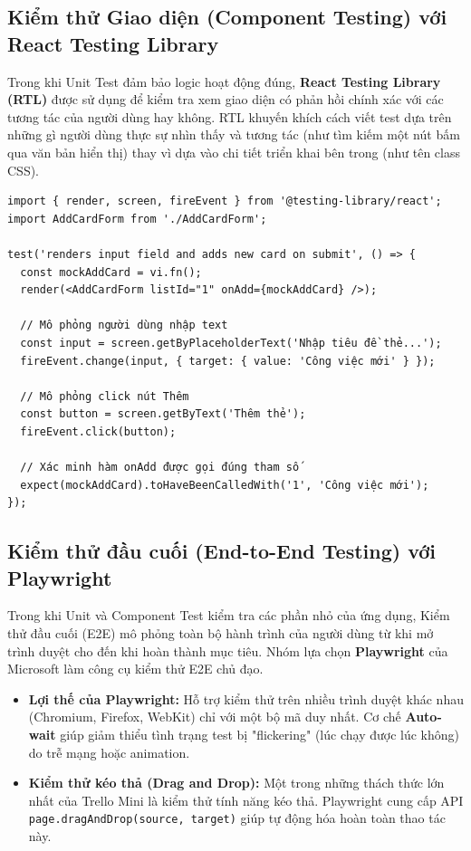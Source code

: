 \subsection{Kiểm thử Giao diện (Component Testing) với React Testing Library}
Trong khi Unit Test đảm bảo logic hoạt động đúng, \textbf{React Testing Library (RTL)} được sử dụng để kiểm tra xem giao diện có phản hồi chính xác với các tương tác của người dùng hay không. RTL khuyến khích cách viết test dựa trên những gì người dùng thực sự nhìn thấy và tương tác (như tìm kiếm một nút bấm qua văn bản hiển thị) thay vì dựa vào chi tiết triển khai bên trong (như tên class CSS).

\begin{Verbatim}
import { render, screen, fireEvent } from '@testing-library/react';
import AddCardForm from './AddCardForm';

test('renders input field and adds new card on submit', () => {
  const mockAddCard = vi.fn();
  render(<AddCardForm listId="1" onAdd={mockAddCard} />);

  // Mô phỏng người dùng nhập text
  const input = screen.getByPlaceholderText('Nhập tiêu đề thẻ...');
  fireEvent.change(input, { target: { value: 'Công việc mới' } });

  // Mô phỏng click nút Thêm
  const button = screen.getByText('Thêm thẻ');
  fireEvent.click(button);

  // Xác minh hàm onAdd được gọi đúng tham số
  expect(mockAddCard).toHaveBeenCalledWith('1', 'Công việc mới');
});
\end{Verbatim}

\subsection{Kiểm thử đầu cuối (End-to-End Testing) với Playwright}
Trong khi Unit và Component Test kiểm tra các phần nhỏ của ứng dụng, Kiểm thử đầu cuối (E2E) mô phỏng toàn bộ hành trình của người dùng từ khi mở trình duyệt cho đến khi hoàn thành mục tiêu. Nhóm lựa chọn \textbf{Playwright} của Microsoft làm công cụ kiểm thử E2E chủ đạo.

\begin{itemize}
    \item \textbf{Lợi thế của Playwright:} Hỗ trợ kiểm thử trên nhiều trình duyệt khác nhau (Chromium, Firefox, WebKit) chỉ với một bộ mã duy nhất. Cơ chế \textbf{Auto-wait} giúp giảm thiểu tình trạng test bị "flickering" (lúc chạy được lúc không) do trễ mạng hoặc animation.
    \item \textbf{Kiểm thử kéo thả (Drag and Drop):} Một trong những thách thức lớn nhất của Trello Mini là kiểm thử tính năng kéo thả. Playwright cung cấp API \texttt{page.dragAndDrop(source, target)} giúp tự động hóa hoàn toàn thao tác này.
\end{itemize}

